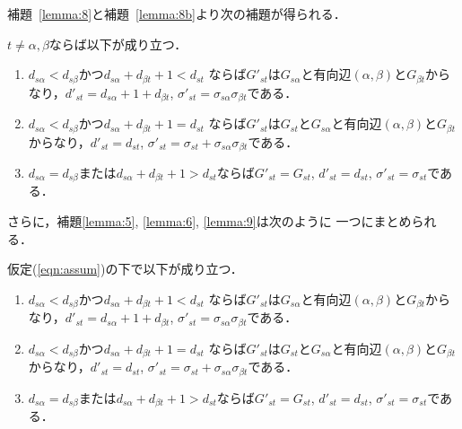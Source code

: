 補題~\ref{lemma:8}と補題~\ref{lemma:8b}より次の補題が得られる．
\begin{lemma}
\rm 
$t \neq \alpha, \beta$ならば以下が成り立つ．
\begin{enumerate}
\item $d_{s\alpha}<d_{s\beta}$かつ$d_{s\alpha}+d_{\beta t}+1<d_{st}$
ならば$G'_{st}$は$G_{s\alpha}$と有向辺$(\alpha,\beta)$と$G_{\beta t}$からなり，$d'_{st}=d_{s\alpha}+1+d_{\beta t}$, $\sigma'_{st}=\sigma_{s\alpha}\sigma_{\beta t}$である．
\item $d_{s\alpha}<d_{s\beta}$かつ$d_{s\alpha}+d_{\beta t}+1=d_{st}$
ならば$G'_{st}$は$G_{st}$と$G_{s\alpha}$と有向辺$(\alpha,\beta)$と$G_{\beta t}$からなり，$d'_{st}=d_{st}$, $\sigma'_{st}=\sigma_{st}+\sigma_{s\alpha}\sigma_{\beta t}$である．
\item $d_{s\alpha}=d_{s\beta}$または$d_{s\alpha}+d_{\beta t}+1>d_{st}$ならば$G'_{st}=G_{st}$, $d'_{st}=d_{st}$, $\sigma'_{st}=\sigma_{st}$である．
\end{enumerate}
\label{lemma:9}
\end{lemma}

さらに，補題\ref{lemma:5}, \ref{lemma:6}, \ref{lemma:9}は次のように
一つにまとめられる．

\begin{theorem}
\rm 
仮定(\ref{eqn:assum})の下で以下が成り立つ．
\begin{enumerate}
\item $d_{s\alpha}<d_{s\beta}$かつ$d_{s\alpha}+d_{\beta t}+1<d_{st}$
ならば$G'_{st}$は$G_{s\alpha}$と有向辺$(\alpha,\beta)$と$G_{\beta t}$からなり，$d'_{st}=d_{s\alpha}+1+d_{\beta t}$, $\sigma'_{st}=\sigma_{s\alpha}\sigma_{\beta t}$である．
\item $d_{s\alpha}<d_{s\beta}$かつ$d_{s\alpha}+d_{\beta t}+1=d_{st}$
ならば$G'_{st}$は$G_{st}$と$G_{s\alpha}$と有向辺$(\alpha,\beta)$と$G_{\beta t}$からなり，$d'_{st}=d_{st}$, $\sigma'_{st}=\sigma_{st}+\sigma_{s\alpha}\sigma_{\beta t}$である．
\item $d_{s\alpha}=d_{s\beta}$または$d_{s\alpha}+d_{\beta t}+1>d_{st}$ならば$G'_{st}=G_{st}$, $d'_{st}=d_{st}$, $\sigma'_{st}=\sigma_{st}$である．
\end{enumerate}
\label{theorem:1}
\end{theorem}

